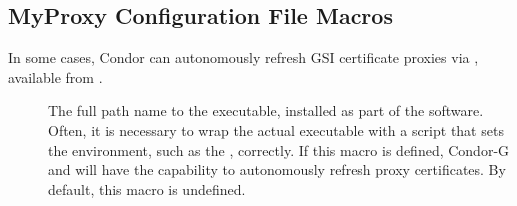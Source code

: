 \begin{description}
\item[] \label{param:QuillHistoryDuration}

\item[]
  \label{param:QuillIsRemotelyQueryable}

\item[] \label{param:QuillDBQueryPassword}

\item[] \label{param:QuillAddressFile}
\end{description}





\subsection{\label{sec:MyProxy-Config-File-Entries}MyProxy
Configuration File Macros}
 
In some cases, Condor can autonomously refresh GSI certificate proxies
via , available from
.

\begin{description}

\item[]
\label{param:MyProxyGetDelegation}  The full path name to the
 executable, installed as part of the
 software.  Often, it is necessary to wrap the actual
executable with a script that sets the environment, such as the
, correctly.  If this macro is defined,
Condor-G and  will have the capability to autonomously
refresh proxy certificates.  By default, this macro is undefined.

\end{description}


